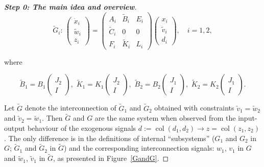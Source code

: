 \documentclass[11pt,a4paper,oneside,DIV=12,headings=small]{scrartcl}
\newcommand{\col}{\operatorname{col}}
\theoremstyle{plain}
\begin{document}
\begin{proof}[\textbf{Step 0: \textit{The main idea and overview}}]
\begin{equation}
\tilde{G}_i: \,
\begin{pmatrix} \dot{x}_i \\ \tilde{w}_i \\ z_i \end{pmatrix}=
\begin{pmatrix} A_i & \tilde{B}_i & E_i \\
\tilde{C}_i & 0 & 0 \\
F_i & \tilde{K}_i & L_i \end{pmatrix}
\begin{pmatrix} x_i \\ \tilde{v}_i \\ d_i \end{pmatrix}, \quad i=1,2, 
\end{equation}

where 

\begin{equation}
\label{BKmatrices}
\tilde{B}_1=B_1\begin{pmatrix} J_2 \\ I \end{pmatrix}, \,\, \tilde{K}_1=K_1\begin{pmatrix} J_2 \\ I \end{pmatrix}, \,\, \tilde{B}_2=B_2\begin{pmatrix} J_1 \\ I \end{pmatrix}, \,\, \tilde{K}_2=K_2\begin{pmatrix} J_1 \\ I \end{pmatrix}.
\end{equation}


Let $\tilde{G}$ denote the interconnection of $\tilde{G}_1$ and $\tilde{G}_2$ obtained with constraints $\tilde{v}_1=\tilde{w}_2$ and $\tilde{v}_2=\tilde{w}_1$. 
Then $\tilde{G}$ and $G$ are the same system when observed from the input-output behaviour of the exogenous signals $d:=\col(d_1,d_2)\rightarrow z=\col(z_1,z_2)$. The only difference is in the definitions of internal ``subsystems'' ($G_1$ and $G_2$ in $G$; $\tilde{G}_1$ and $\tilde{G}_2$ in $\tilde{G}$) and the corresponding interconnection signals:  $w_1$, $v_1$ in $G$ and $\tilde{w}_1$, $\tilde{v}_1$ in $\tilde{G}$, as presented in Figure~\ref{GandG}.


\end{proof}
\end{document}
